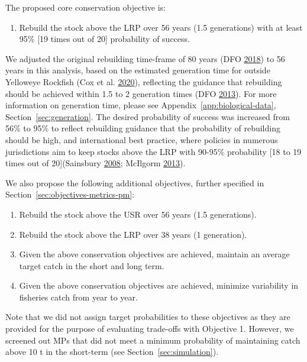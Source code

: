 \documentclass[11pt]{book}
\begin{document}
The proposed core conservation objective is:
\begin{enumerate}
\def\labelenumi{\arabic{enumi}.}

\item
  Rebuild the stock above the LRP over 56 years (1.5 generations) with at least 95\% {[}19 times out of 20{]} probability of success.
\end{enumerate}
We adjusted the original rebuilding time-frame of 80 years (DFO \protect\hyperlink{ref-ifmp2018}{2018}) to 56 years in this analysis, based on the estimated generation time for outside Yelloweye Rockfish (Cox et al. \protect\hyperlink{ref-cox2020}{2020}), reflecting the guidance that rebuilding should be achieved within 1.5 to 2 generation times (DFO \protect\hyperlink{ref-dfo2013}{2013}). For more information on generation time, please see Appendix~\ref{app:biological-data}, Section~\ref{sec:generation}. The desired probability of success was increased from 56\% to 95\% to reflect rebuilding guidance that the probability of rebuilding should be high, and international best practice, where policies in numerous jurisdictions aim to keep stocks above the LRP with 90-95\% probability {[}18 to 19 times out of 20{]}(Sainsbury \protect\hyperlink{ref-sainsbury2008}{2008}; McIlgorm \protect\hyperlink{ref-mcilgorm2013}{2013}).

We also propose the following additional objectives, further specified in Section~\ref{sec:objectives-metrics-pm}:
\begin{enumerate}
\def\labelenumi{\arabic{enumi}.}
\setcounter{enumi}{1}
\item
  Rebuild the stock above the USR over 56 years (1.5 generations).
\item
  Rebuild the stock above the LRP over 38 years (1 generation).
\item
  Given the above conservation objectives are achieved, maintain an average target catch in the short and long term.
\item
  Given the above conservation objectives are achieved, minimize variability in fisheries catch from year to year.
\end{enumerate}
Note that we did not assign target probabilities to these objectives as they are provided for the purpose of evaluating trade-offs with Objective 1. However, we screened out MPs that did not meet a minimum probability of maintaining catch above 10 t in the short-term (see Section~\ref{sec:simulation}).
\end{document}
